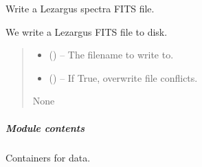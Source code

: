 \documentclass[letterpaper,11pt,english]{sphinxmanual}
\begin{document}
\begin{savenotes}
\begin{fulllineitems}
\begin{savenotes}\begin{fulllineitems}
\label{\detokenize{code/lezargus.container.spectra:lezargus.container.spectra.LezargusSpectra.write_fits_file}}
\pysigstartsignatures
{}
\pysigstopsignatures
\sphinxAtStartPar
Write a Lezargus spectra FITS file.

\sphinxAtStartPar
We write a Lezargus FITS file to disk.
\begin{quote}\begin{description}
\begin{itemize}
\item {} 
\sphinxAtStartPar
{} () – The filename to write to.

\item {} 
\sphinxAtStartPar
{} (\sphinxstyleliteralemphasis{\sphinxupquote{, }}) – If True, overwrite file conflicts.

\end{itemize}

\sphinxAtStartPar
None

\end{description}\end{quote}

\end{fulllineitems}\end{savenotes}


\end{fulllineitems}\end{savenotes}



\subparagraph{Module contents}
\label{\detokenize{code/lezargus.container:module-lezargus.container}}\label{\detokenize{code/lezargus.container:module-contents}}
\sphinxAtStartPar
Containers for data.
\end{document}
